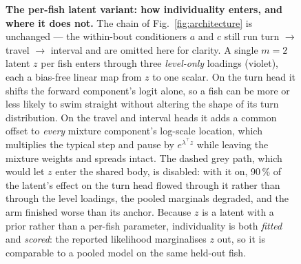 \begin{figure}[p]
{\begin{tikzpicture}
\end{tikzpicture}}
\caption{\textbf{The per-fish latent variant: how individuality enters, and where it does not.}
The chain of Fig.~\ref{fig:architecture} is unchanged --- the within-bout conditioners $a$ and
$c$ still run turn $\to$ travel $\to$ interval and are omitted here for clarity. A single
$m=2$ latent $z$ per fish enters through three \emph{level-only} loadings (violet), each a
bias-free linear map from $z$ to one scalar. On the turn head it shifts the forward
component's logit alone, so a fish can be more or less likely to swim straight without
altering the shape of its turn distribution. On the travel and interval heads it adds a
common offset to \emph{every} mixture component's log-scale location, which multiplies the
typical step and pause by $e^{\lambda^{\top} z}$ while leaving the mixture weights and spreads
intact. The dashed grey path, which would let $z$ enter the shared body, is disabled: with it
on, 90\,\% of the latent's effect on the turn head flowed through it rather than through the
level loadings, the pooled marginals degraded, and the arm finished worse than its anchor.
Because $z$ is a latent with a prior rather than a per-fish parameter, individuality is both
\emph{fitted} and \emph{scored}: the reported likelihood marginalises $z$ out, so it is
comparable to a pooled model on the same held-out fish.}
\label{fig:architecture-latent}
\end{figure}
